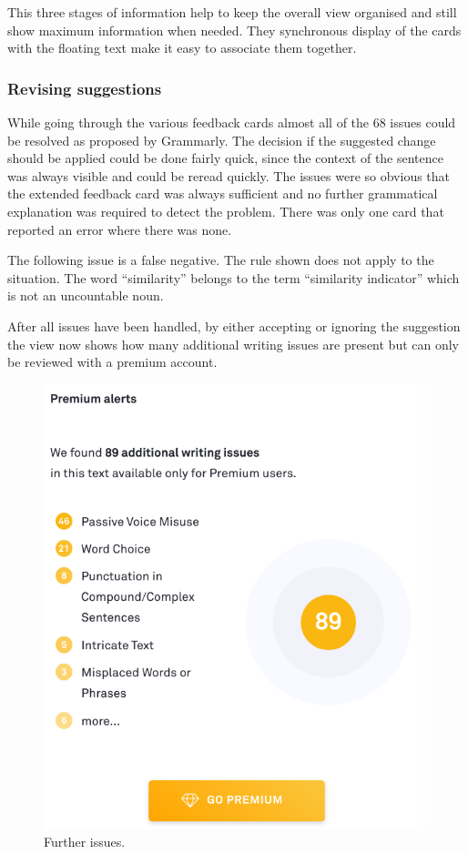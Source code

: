 \documentclass[runningheads]{llncs}
\let\OldTextregistered\textregistered
\renewcommand{\textregistered}{\OldTextregistered\xspace}%
\begin{document}
This three stages of information help to keep the overall view organised and still show maximum information when needed. They synchronous display of the cards with the floating text make it easy to associate them together. 

\subsubsection{Revising suggestions}
While going through the various feedback cards almost all of the 68 issues could be resolved as proposed by Grammarly\textregistered. The decision if the suggested change should be applied could be done fairly quick, since the context of the sentence was always visible and could be reread quickly. The issues were so obvious that the extended feedback card was always sufficient and no further grammatical explanation was required to detect the problem. There was only one card that reported an error where there was none. 

The following issue is a false negative. The rule shown does not apply to the situation. The word ``similarity'' belongs to the term ``similarity indicator'' which is not an uncountable noun.


\noindent{}

After all issues have been handled, by either accepting or ignoring the suggestion the view now shows how many additional writing issues are present but can only be reviewed with a premium account.

\begin{figure}[H]
  \includegraphics[width=0.8\linewidth]{images/premium.png}
  \caption{Further issues.}
  \label{fig:premium}
\end{figure}
\end{document}
